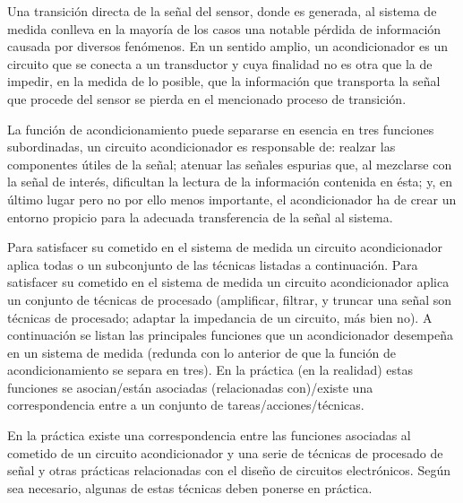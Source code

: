 Una transición directa de la señal del sensor, donde es generada, al
sistema de medida conlleva en la mayoría de los casos una notable pérdida
de información causada por diversos fenómenos. En un sentido amplio, un
acondicionador es un circuito que se conecta a un transductor y cuya
finalidad no es otra que la de impedir, en la medida de lo posible, que la
información que transporta la señal que procede del sensor se pierda en el
mencionado proceso de transición.

La función de acondicionamiento puede separarse en esencia en tres
funciones subordinadas, un circuito acondicionador es responsable de:
realzar las componentes útiles de la señal; atenuar las señales espurias
que, al mezclarse con la señal de interés, dificultan la lectura de la
información contenida en ésta; y, en último lugar pero no por ello menos
importante, el acondicionador ha de crear un entorno propicio para la
adecuada transferencia de la señal al sistema.


Para satisfacer su cometido en el sistema de medida un circuito
acondicionador aplica todas o un subconjunto de las técnicas listadas a
continuación. Para satisfacer su cometido en el sistema de medida un
circuito acondicionador aplica un conjunto de técnicas de procesado
(amplificar, filtrar, y truncar una señal son técnicas de procesado;
adaptar la impedancia de un circuito, más bien no). A continuación se
listan las principales funciones que un acondicionador desempeña en un
sistema de medida (redunda con lo anterior de que la función de
acondicionamiento se separa en tres). En la práctica (en la realidad) estas
funciones se asocian/están asociadas (relacionadas con)/existe una
correspondencia entre a un conjunto de tareas/acciones/técnicas.



En la práctica existe una correspondencia entre las funciones asociadas al
cometido de un circuito acondicionador y una serie de técnicas de
procesado de señal y otras prácticas relacionadas con el diseño de
circuitos electrónicos. Según sea necesario, algunas de estas técnicas
deben ponerse en práctica.

